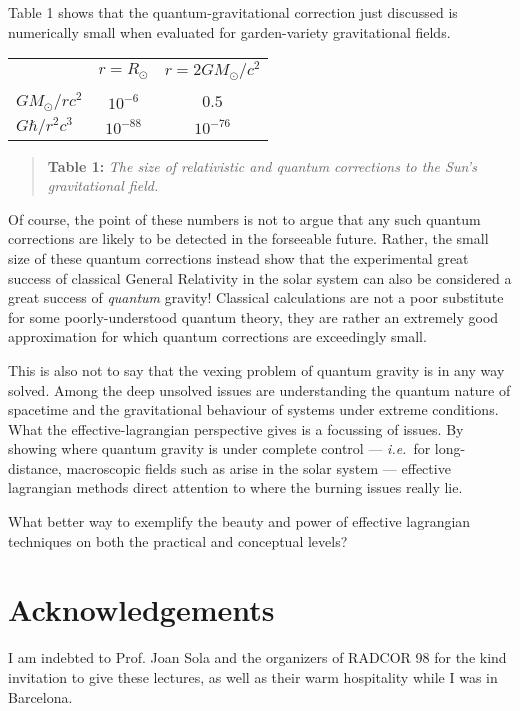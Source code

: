 \documentclass[12pt]{article}
\def\ie{{\it i.e.}}
\begin{document}
Table 1 shows that the quantum-gravitational correction just 
discussed is numerically small when evaluated for 
garden-variety gravitational fields. 

\vspace{3mm}
\begin{center}
\begin{tabular}{lcc}
& $r = R_\odot$ & $r = 2 GM_\odot/c^2$ \\
&&\\
$GM_\odot/rc^2$ & $10^{-6}$ & $0.5$ \\
$G\hbar/r^2c^3$ & $10^{-88}$ & $10^{-76}$ 
\end{tabular}
\end{center}

\begin{quote}
{\footnotesize               
{\bf Table 1:} {\sl The size of relativistic and quantum corrections
to the Sun's gravitational field.}}
\end{quote}

Of course, the point of these numbers is not to argue
that any such quantum corrections are likely to be detected
in the forseeable future. Rather, the small size of these
quantum corrections instead show that the experimental 
great success of classical General Relativity in the
solar system can also be considered a great success
of {\it quantum} gravity! Classical calculations are 
not a poor substitute for some poorly-understood
quantum theory, they are rather an extremely good
approximation for which quantum corrections are 
exceedingly small. 

This is also not to say that the vexing problem
of quantum gravity is in any way solved. Among the
deep unsolved issues are understanding the quantum
nature of spacetime and the gravitational behaviour of
systems under extreme conditions. What the
effective-lagrangian perspective gives is a focussing of
issues. By showing where quantum gravity is under complete
control --- \ie\ for long-distance, macroscopic fields such
as arise in the solar system --- effective lagrangian methods
direct attention to where the burning issues really lie. 

What better way to exemplify the beauty and power 
of effective lagrangian
techniques on both the practical and conceptual levels?

\section*{Acknowledgements}
I am indebted to Prof. Joan Sola and the organizers of
RADCOR 98 for the kind invitation to give these lectures, as 
well as their warm hospitality while I was in Barcelona.
\end{document}
